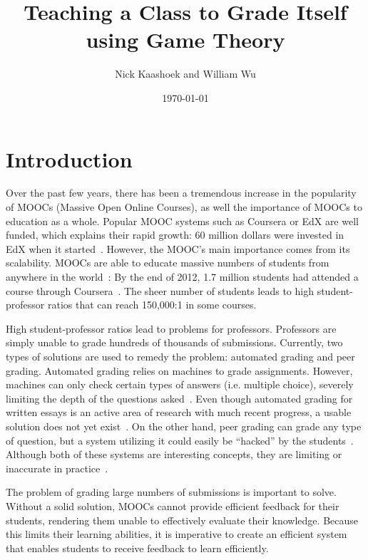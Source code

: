 \documentclass[12pt, Arial]{article}
\title{Teaching a Class to Grade Itself using Game Theory}
\author{Nick Kaashoek and William Wu}
\date{\today}
\begin{document}
\maketitle
\section{Introduction}
\cite{m85}
Over the past few years, there has been a tremendous increase in the popularity of MOOCs (Massive Open Online Courses), as well the importance of MOOCs to education as a whole. Popular MOOC systems such as Coursera or EdX are well funded, which explains their rapid growth: 60 million dollars were invested in EdX when it started~\cite{canmoocsreducecc}. However, the MOOC's main importance comes from its scalability. MOOCs are able to educate massive numbers of students from anywhere in the world~\cite{makingsenseofmoocs}: By the end of 2012, 1.7 million students had attended a course through Coursera~\cite{swotanalysisofmoocs}. The sheer number of students leads to high student-professor ratios that can reach 150,000:1 in some courses.

High student-professor ratios lead to problems for professors. Professors are simply unable to grade hundreds of thousands of submissions. Currently, two types of solutions are used to remedy the problem: automated grading and peer grading. Automated grading relies on machines to grade assignments. However, machines can only check certain types of answers (i.e. multiple choice), severely limiting the depth of the questions asked~\cite{rightandwrongmoocs}. Even though automated grading for written essays is an active area of research with much recent progress, a usable solution does not yet exist~\cite{automatedsystemssuck}. On the other hand, peer grading can grade any type of question, but a system utilizing it could easily be ``hacked'' by the students~\cite{makingsenseofmoocs}. Although both of these systems are interesting concepts, they are limiting or inaccurate in practice~\cite{howaccurateispeergrading}.

The problem of grading large numbers of submissions is important to solve. Without a solid solution, MOOCs cannot provide efficient feedback for their students, rendering them unable to effectively evaluate their knowledge. Because this limits their learning abilities, it is imperative to create an efficient system that enables students to receive feedback to learn efficiently.
\end{document}
